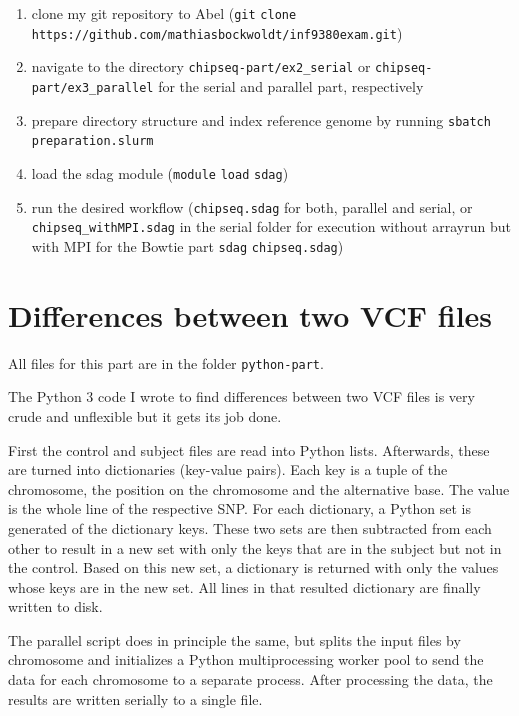 \documentclass[paper=a4, 12pt]{scrartcl}
\begin{document}
\begin{flushleft}
\begin{enumerate}
\item clone my git repository to Abel (\texttt{git} \texttt{clone} \texttt{https://}\allowbreak\texttt{github.com/}\allowbreak\texttt{mathiasbockwoldt/}\allowbreak\texttt{inf9380exam.git})
\item navigate to the directory \texttt{chipseq-part/}\allowbreak\texttt{ex2\_serial} or \texttt{chipseq-part/}\allowbreak\texttt{ex3\_parallel} for the serial and parallel part, respectively
\item prepare directory structure and index reference genome by running \texttt{sbatch} \texttt{preparation.slurm}
\item load the sdag module (\texttt{module} \texttt{load} \texttt{sdag})
\item run the desired workflow (\texttt{chipseq.sdag} for both, parallel and serial, or \texttt{chipseq\_withMPI.sdag} in the serial folder for execution without arrayrun but with MPI for the Bowtie part \texttt{sdag} \texttt{chipseq.sdag})
\end{enumerate}
\end{flushleft}


\section{Differences between two VCF files}

All files for this part are in the folder \texttt{python-part}.

The Python 3 code I wrote to find differences between two VCF files is very crude and unflexible but it gets its job done.

First the control and subject files are read into Python lists. Afterwards, these are turned into dictionaries (key-value pairs). Each key is a tuple of the chromosome, the position on the chromosome and the alternative base. The value is the whole line of the respective SNP. For each dictionary, a Python set is generated of the dictionary keys. These two sets are then subtracted from each other to result in a new set with only the keys that are in the subject but not in the control. Based on this new set, a dictionary is returned with only the values whose keys are in the new set. All lines in that resulted dictionary are finally written to disk.

The parallel script does in principle the same, but splits the input files by chromosome and initializes a Python multiprocessing worker pool to send the data for each chromosome to a separate process. After processing the data, the results are written serially to a single file.
\end{document}
